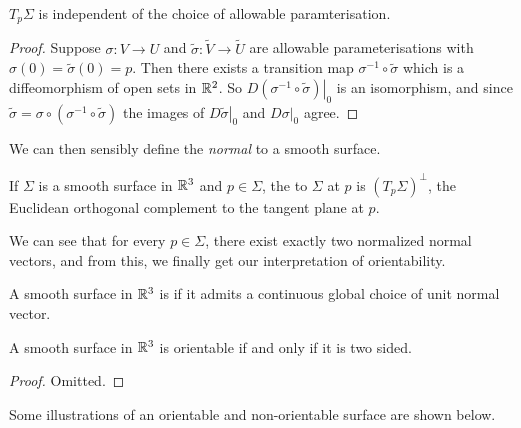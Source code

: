 \documentclass[a4paper, 10pt, twocolumn]{amsart}
\begin{document}
\begin{lemma}
$T_p\Sigma$ is independent of the choice of allowable paramterisation.
\end{lemma}
\begin{proof}
    Suppose $\sigma: V \rightarrow U$ and $\tilde \sigma : \tilde V \rightarrow \tilde U$ are allowable parameterisations with $\sigma(0) = \tilde \sigma(0) = p$. Then there exists a transition map $\sigma^{-1} \circ \tilde \sigma$ which is a diffeomorphism of open sets in $\mathbb{R}^2$. So $D\left.(\sigma^{-1} \circ \tilde \sigma) \right|_0$ is an isomorphism, and since $\tilde \sigma = \sigma \circ (\sigma^{-1} \circ \tilde \sigma)$ the images of $\left.D \tilde\sigma\right|_0$ and $\left.D \sigma\right|_0$ agree.
\end{proof}

We can then sensibly define the \emph{normal} to a smooth surface.

\begin{definition}
    If $\Sigma$ is a smooth surface in $\mathbb{R}^3$ and $p \in \Sigma$, the  to $\Sigma$ at $p$ is $(T_p \Sigma)^\perp$, the Euclidean orthogonal complement to the tangent plane at $p$.
\end{definition}

We can see that for every $p \in \Sigma$, there exist exactly two normalized normal vectors, and from this, we finally get our interpretation of orientability.

\begin{definition}
    A smooth surface in $\mathbb{R}^3$ is  if it admits a continuous global choice of unit normal vector.
\end{definition}

\begin{lemma}
    A smooth surface in $\mathbb{R}^3$ is orientable if and only if it is two sided.
\end{lemma}
\begin{proof}
    Omitted.
\end{proof}

Some illustrations of an orientable and non-orientable surface are shown below.
\end{document}
